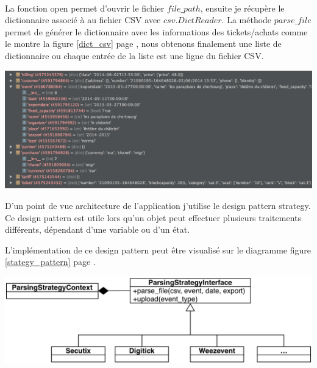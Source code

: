 \leavevmode \\
La fonction open permet d'ouvrir le fichier $file\_path$, ensuite je récupère le dictionnaire associé à au fichier CSV avec $csv.DictReader$. La méthode $parse\_file$ permet de générer le dictionnaire avec les informations des tickets/achats comme le montre la figure \ref{dict_csv} page \pageref{dict_csv}, nous obtenons finalement une liste de dictionnaire ou chaque entrée de la liste est une ligne du fichier CSV. 

\begin{center}
\includegraphics[scale=0.45]{Images/dict_tickets.png}
\label{dict_csv}
\end{center}


D'un point de vue architecture de l'application j'utilise le design pattern strategy. Ce design pattern est utile lors qu'un objet peut effectuer plusieurs traitements différents, dépendant d'une variable ou d'un état.

L'implémentation de ce design pattern peut être visualisé sur le diagramme figure \ref{stategy_pattern} page \pageref{dict_csv}.

\begin{center}
\includegraphics[scale=0.75]{Images/StrategyPattern.png}
\label{stategy_pattern}
\end{center}



